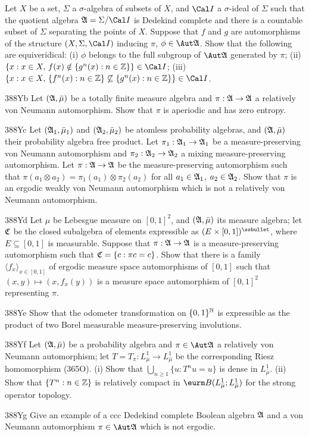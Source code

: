 {
Let $X$ be a set, $\Sigma$ a $\sigma$-algebra of subsets
of $X$, and $\Cal I$ a $\sigma$-ideal of $\Sigma$ such that the quotient
algebra $\frak A=\Sigma/\Cal I$ is Dedekind complete and there is a
countable subset of $\Sigma$ separating the points of $X$.   Suppose
that $f$ and $g$ are automorphisms of the structure $(X,\Sigma,\Cal I)$
inducing $\pi$, $\phi\in\Aut\frak A$.   Show that the following are
equiveridical:  (i) $\phi$ belongs to the full subgroup of $\Aut\frak A$
generated by $\pi$;
(ii) $\{x:x\in X,\,f(x)\notin\{g^n(x):n\in\Bbb Z\}\}\in\Cal I$;
(iii) $\{x:x\in X,\,\{f^n(x):n\in\Bbb Z\}
\not\subseteq\{g^n(x):n\in\Bbb Z\}\}\in\Cal I$.
     
\spheader 388Yb %
Let $(\frak A,\bar\mu)$ be a totally finite measure
algebra and $\pi:\frak A\to\frak A$ a relatively von Neumann
automorphism.   Show that $\pi$ is aperiodic and has zero entropy.
     
\spheader 388Yc %
Let $(\frak A_1,\bar\mu_1)$ and $(\frak A_2,\bar\mu_2)$
be atomless probability algebras, and $(\frak A,\bar\mu)$ their
probability algebra free product.   Let $\pi_1:\frak A_1\to\frak A_1$ be
a measure-preserving von Neumann automorphism and
$\pi_2:\frak A_2\to\frak A_2$ a mixing measure-preserving automorphism.
Let $\pi:\frak A\to\frak A$ be the measure-preserving automorphism such
that $\pi(a_1\otimes a_2)=\pi_1(a_1)\otimes\pi_2(a_2)$ for all
$a_1\in\frak A_1$, $a_2\in\frak A_2$.   Show that $\pi$ is an ergodic
weakly von Neumann automorphism which is not a relatively von Neumann
automorphism.
     
\spheader 388Yd %
Let $\mu$ be Lebesgue measure on $[0,1]^2$, and
$(\frak A,\bar\mu)$ its measure algebra;  let $\frak C$ be the closed
subalgebra
of elements expressible as $(E\times[0,1])^{\ssbullet}$, where
$E\subseteq [0,1]$ is measurable.   Suppose that $\pi:\frak A\to\frak A$
is a measure-preserving automorphism such that $\frak C=\{c:\pi c=c\}$.
Show that there
is a family $\langle f_x\rangle_{x\in[0,1]}$ of ergodic measure space
automorphisms of $[0,1]$ such that $(x,y)\mapsto (x,f_x(y))$ is a
measure space automorphism of $[0,1]^2$ representing $\pi$.
     
\spheader 388Ye %
Show that the odometer transformation on
$\{0,1\}^{\Bbb N}$ is expressible as the product of
two Borel measurable measure-preserving involutions.
     
\spheader 388Yf Let $(\frak A,\bar\mu)$ be a probability algebra and
$\pi\in\Aut\frak A$ a relatively von Neumann automorphism;  let
$T=T_{\pi}:L^1_{\bar\mu}\to L^1_{\bar\mu}$ be the corresponding Riesz
homomorphism (365O).   (i) Show that $\bigcup_{n\ge 1}\{u:T^nu=u\}$ is
dense in $L^1_{\bar\mu}$.   (ii) Show that $\{T^n:n\in\Bbb Z\}$ is
relatively compact in $\eurm B(L^1_{\bar\mu};L^1_{\bar\mu})$ for the
strong operator topology.

\spheader 388Yg Give an example of a ccc Dedekind complete
Boolean algebra $\frak A$ and a von Neumann automorphism 
$\pi\in\Aut\frak A$ which is not ergodic.
}%
     
